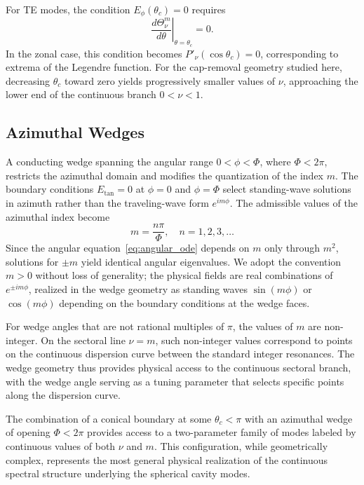 \documentclass[
  aip,
  amsmath,amssymb,
  preprint
]{revtex4-1}
\begin{document}
For TE modes, the condition $E_\phi(\theta_c) = 0$ requires
\begin{equation}
\left.\frac{d\Theta_\nu^m}{d\theta}\right|_{\theta = \theta_c} = 0.
\label{eq:cone_BC_TE}
\end{equation}
In the zonal case, this condition becomes $P'_{\nu}(\cos\theta_c)=0$, corresponding to extrema of the Legendre function. For the cap-removal geometry studied here, decreasing $\theta_c$ toward zero yields progressively smaller values of $\nu$, approaching the lower end of the continuous branch $0<\nu<1$.


\subsection{Azimuthal Wedges}

A conducting wedge spanning the angular range $0 < \phi < \Phi$, where $\Phi < 2\pi$, restricts the azimuthal domain and modifies the quantization of the index $m$. The boundary conditions $E_\text{tan} = 0$ at $\phi = 0$ and $\phi = \Phi$ select standing-wave solutions in azimuth rather than the traveling-wave form $e^{im\phi}$. The admissible values of the azimuthal index become
\begin{equation}
m = \frac{n\pi}{\Phi}, \quad n = 1, 2, 3, \ldots
\label{eq:wedge_m}
\end{equation}
Since the angular equation~\eqref{eq:angular_ode} depends on $m$ only through $m^2$, solutions for $\pm m$ yield identical angular eigenvalues. We adopt the convention $m > 0$ without loss of generality; the physical fields are real combinations of $e^{\pm im\phi}$, realized in the wedge geometry as standing waves $\sin(m\phi)$ or $\cos(m\phi)$ depending on the boundary conditions at the wedge faces.

For wedge angles that are not rational multiples of $\pi$, the values of $m$ are non-integer. On the sectoral line $\nu = m$, such non-integer values correspond to points on the continuous dispersion curve between the standard integer resonances. The wedge geometry thus provides physical access to the continuous sectoral branch, with the wedge angle serving as a tuning parameter that selects specific points along the dispersion curve.

The combination of a conical boundary at some $\theta_c < \pi$ with an azimuthal wedge of opening $\Phi < 2\pi$ provides access to a two-parameter family of modes labeled by continuous values of both $\nu$ and $m$. This configuration, while geometrically complex, represents the most general physical realization of the continuous spectral structure underlying the spherical cavity modes.
\end{document}
